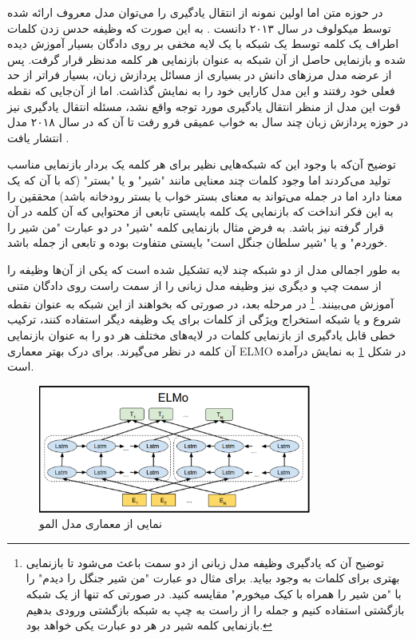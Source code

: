 در حوزه متن اما اولین نمونه از انتقال یادگیری را می‌توان مدل معروف 
 ارائه شده توسط میکولوف در سال ۲۰۱۳ دانست
\cite{word2vec_paper}.
به این صورت که وظیفه حدس زدن کلمات اطراف یک کلمه توسط یک شبکه با یک لایه مخفی بر روی دادگان بسیار آموزش دیده شده و بازنمایی حاصل از آن شبکه به عنوان بازنمایی هر کلمه مدنظر قرار گرفت. پس از عرضه مدل 
مرز‌های دانش در بسیاری از مسائل پردازش زبان، بسیار فراتر از حد فعلی خود رفتند و این مدل کارایی خود را به نمایش گذاشت. اما از آن‌جایی که نقطه قوت این مدل از منظر انتقال یادگیری مورد توجه واقع نشد،‌ مسئله انتقال یادگیری نیز در حوزه پردازش زبان چند سال به خواب عمیقی فرو رفت تا آن که در سال ۲۰۱۸ مدل 
انتشار یافت
\cite{elmo_paper}.

توضیح آن‌که با وجود این که شبکه‌هایی نظیر 
برای هر کلمه یک بردار بازنمایی مناسب تولید می‌کردند اما وجود کلمات چند معنایی مانند "شیر" و یا "بستر" (که با آن که یک معنا دارد اما  در جمله‌ می‌تواند به معنای بستر خواب یا بستر رودخانه باشد) محققین را به این فکر انداخت که بازنمایی یک کلمه بایستی تابعی از محتوایی که آن کلمه در آن قرار گرفته نیز باشد.  به فرض مثال بازنمایی کلمه "شیر" در دو عبارت "من شیر را خوردم" و یا "شیر سلطان جنگل است" بایستی متفاوت بوده و تابعی از جمله باشد. 

به طور اجمالی مدل 
از دو شبکه 
چند لایه تشکیل شده است که یکی از آن‌ها وظیفه 
را از سمت چپ و دیگری نیز وظیفه 
مدل زبانی
را از سمت راست روی دادگان متنی آموزش می‌بینند. 
\footnote{
توضیح آن که یادگیری وظیفه مدل زبانی از دو سمت باعث می‌شود تا بازنمایی بهتری برای کلمات به وجود بیاید. برای مثال دو عبارت "من شیر جنگل را دیدم" را با "من شیر را همراه با کیک میخورم" مقایسه کنید. در صورتی که تنها از یک شبکه بازگشتی استفاده کنیم و جمله را از راست به چپ به شبکه بازگشتی ورودی بدهیم بازنمایی کلمه شیر در هر دو عبارت یکی خواهد بود.
}
در مرحله بعد، در صورتی که بخواهند از این شبکه به عنوان نقطه شروع و یا شبکه استخراج ویژگی از کلمات برای یک وظیفه دیگر استفاده کنند، ترکیب خطی قابل یادگیری از بازنمایی کلمات در لایه‌های مختلف هر دو
را به عنوان بازنمایی آن کلمه در نظر می‌گیرند. برای درک بهتر معماری ELMO در شکل 
\ref{fig:chap3:elmo_arch}
به نمایش درآمده است.

\begin{figure}[h]
	\centering
	\includegraphics[width=0.8\textwidth]{images/chap3/elmo_arch.png}
	\caption{
		نمایی از معماری مدل المو
	}
	\label{fig:chap3:elmo_arch}
\end{figure}

